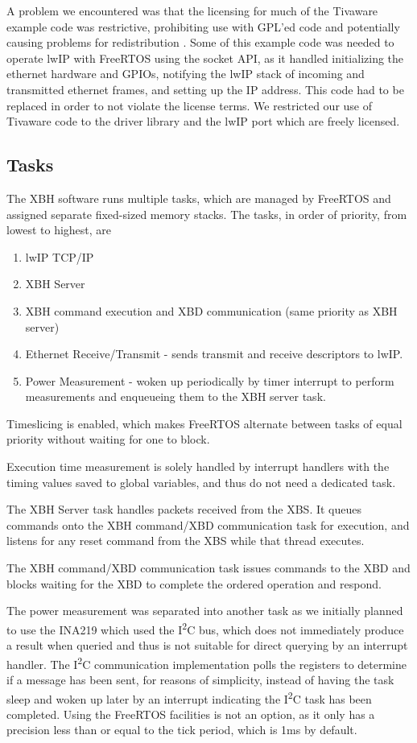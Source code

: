 \documentclass[twoside,11pt]{cergdoc}
\newcommand{\ITwoC}{I\textsuperscript{2}C }
\begin{document}
A problem we encountered was that the licensing for much of the Tivaware example
code was restrictive, prohibiting use with GPL'ed code and potentially causing
problems for redistribution \cite{tivaware-c}. Some of this example code was
needed to operate lwIP with FreeRTOS using the socket API, as it handled
initializing the ethernet hardware and GPIOs, notifying the lwIP stack of
incoming and transmitted ethernet frames, and setting up the IP address. This code had to be
replaced in order to not violate the license terms. We restricted our use of
Tivaware code to the driver library and the lwIP port which are freely licensed. 


    \subsection{Tasks}
The XBH software runs multiple tasks, which are managed by FreeRTOS and assigned
separate fixed-sized memory stacks. The tasks, in order of priority, from lowest to
highest, are
\begin{enumerate}
    \item lwIP TCP/IP
    \item XBH Server
\setcounter{enumi}{1}
    \item XBH command execution and XBD communication (same priority as XBH
        server)
    \item Ethernet Receive/Transmit - sends transmit and receive descriptors to
        lwIP.
    \item Power Measurement - woken up periodically by timer interrupt to
        perform measurements and enqueueing them to the XBH server task.
\end{enumerate}
Timeslicing is enabled, which makes FreeRTOS alternate between tasks of equal
priority without waiting for one to block. 

Execution time measurement is solely handled by interrupt handlers with the
timing values saved to global variables, and thus do not need a dedicated task.

The XBH Server task handles packets received from the XBS. It queues commands
onto the XBH command/XBD communication task for execution, and listens for
any reset command from the XBS while that thread executes. 

The XBH command/XBD communication task issues commands to the XBD and blocks
waiting for the XBD to complete the ordered operation and respond. 



The power measurement was separated into another task as we initially planned to
use the INA219 which used the \ITwoC bus, which does not immediately produce a result
when queried and thus is not suitable for direct querying by an interrupt
handler. The \ITwoC communication implementation polls the registers to determine if a
message has been sent, for reasons of simplicity, instead of having the task
sleep and woken up later by an interrupt indicating the \ITwoC task has been
completed. Using the FreeRTOS facilities is not an option, as it only has a
precision less than or equal to the tick period, which is 1ms  by default.
\end{document}
